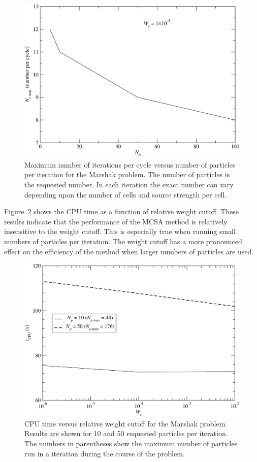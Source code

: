 \documentclass[preprint,12pt]{elsarticle}
\begin{document}
\begin{figure}[ht!]
  \centerline{ \includegraphics[width=5in,clip]{mrshk_np_Ns.pdf}}
  \caption{ Maximum number of iterations per cycle versus number of
    particles per iteration for the Marshak problem.  The number of
    particles is the requested number.  In each iteration the exact number
    can vary depending upon the number of cells and source strength
    per cell.}
  \label{fig:CPU_Ns}
\end{figure}

Figure~\ref{fig:CPU_wc} shows the CPU time as a function of relative weight
cutoff.  These results indicate that the performance of the MCSA method is
relatively insensitive to the weight cutoff.  This is especially true when
running small numbers of particles per iteration.  The weight cutoff has a more
pronounced effect on the efficiency of the method when larger numbers of
particles are used.
\begin{figure}[ht!]
  \centerline{ \includegraphics[width=5in,clip]{mrshk_wc_CPU.pdf}}
  \caption{ CPU time versus relative weight cutoff for the Marshak
    problem.  Results are shown for 10 and 50 requested particles per
    iteration.  The numbers in parentheses show the maximum number of
    particles run in a iteration during the course of the problem.}
  \label{fig:CPU_wc}
\end{figure}
\end{document}

